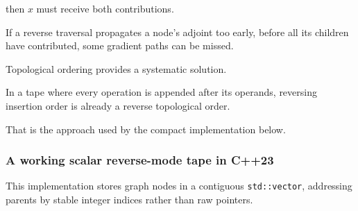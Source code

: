 then \(x\) must receive both contributions.

If a reverse traversal propagates a node's adjoint too early, before all its children have contributed, some gradient paths can be missed.

Topological ordering provides a systematic solution.

In a tape where every operation is appended after its operands, reversing insertion order is already a reverse topological order.

That is the approach used by the compact implementation below.

\subsubsection{A working scalar reverse-mode tape in C++23}\label{02-foundations-ii-ch022-a-working-scalar-reverse-mode-tape-in-c23}

\hypertarget{02-foundations-ii-ch022-a-working-scalar-reverse-mode-tape-in-c23}{}

This implementation stores graph nodes in a contiguous \texttt{std::vector}, addressing parents by stable integer indices rather than raw pointers.

